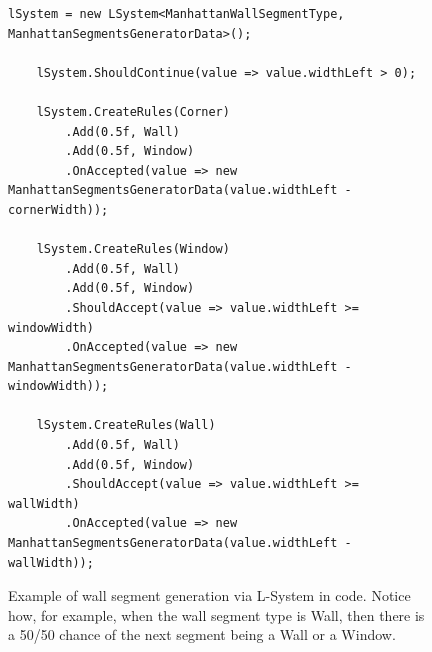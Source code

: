 \begin{figure}[H]
  \begin{lstlisting}[]
    lSystem = new LSystem<ManhattanWallSegmentType, ManhattanSegmentsGeneratorData>();

    lSystem.ShouldContinue(value => value.widthLeft > 0);

    lSystem.CreateRules(Corner)
        .Add(0.5f, Wall)
        .Add(0.5f, Window)
        .OnAccepted(value => new ManhattanSegmentsGeneratorData(value.widthLeft - cornerWidth));

    lSystem.CreateRules(Window)
        .Add(0.5f, Wall)
        .Add(0.5f, Window)
        .ShouldAccept(value => value.widthLeft >= windowWidth)
        .OnAccepted(value => new ManhattanSegmentsGeneratorData(value.widthLeft - windowWidth));

    lSystem.CreateRules(Wall)
        .Add(0.5f, Wall)
        .Add(0.5f, Window)
        .ShouldAccept(value => value.widthLeft >= wallWidth)
        .OnAccepted(value => new ManhattanSegmentsGeneratorData(value.widthLeft - wallWidth));
  \end{lstlisting}
  \label{fig:lsystem-example}
  \caption{Example of wall segment generation via L-System in code. Notice how, for example, when the wall segment type is Wall, then there is a 50/50 chance of the next segment being a Wall or a Window.}
\end{figure}
